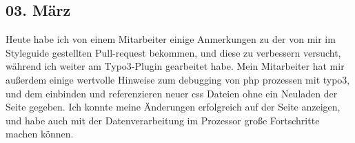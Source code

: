 \subsection{03. März}
Heute habe ich von einem Mitarbeiter einige Anmerkungen zu der von mir im Styleguide gestellten Pull-request bekommen, und diese zu verbessern versucht, während ich weiter am Typo3-Plugin gearbeitet habe. Mein Mitarbeiter hat mir außerdem einige wertvolle Hinweise zum debugging von php prozessen mit typo3, und dem einbinden und referenzieren neuer css Dateien ohne ein Neuladen der Seite gegeben. Ich konnte meine Änderungen erfolgreich auf der Seite anzeigen, und habe auch mit der Datenverarbeitung im Prozessor große Fortschritte machen können.